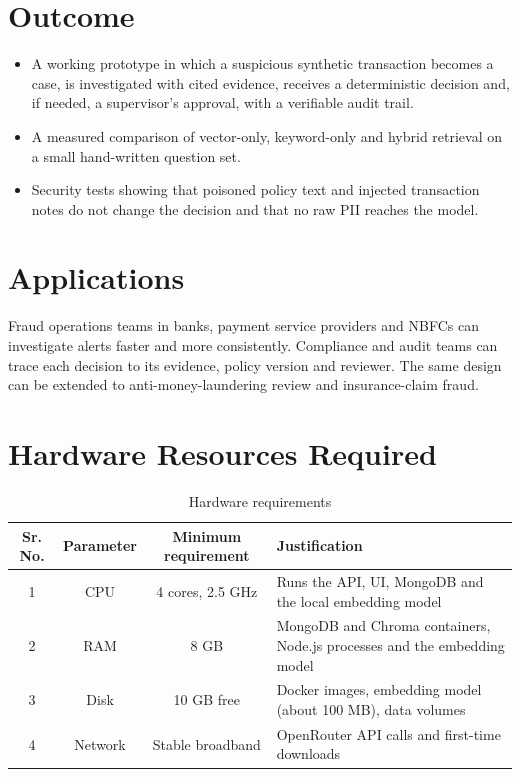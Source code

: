 \documentclass[oneside,a4paper,12pt]{report}
\begin{document}
\section{Outcome}
\begin{itemize}
  \item A working prototype in which a suspicious synthetic transaction becomes a case, is investigated with cited evidence, receives a deterministic decision and, if needed, a supervisor's approval, with a verifiable audit trail.
  \item A measured comparison of vector-only, keyword-only and hybrid retrieval on a small hand-written question set.
  \item Security tests showing that poisoned policy text and injected transaction notes do not change the decision and that no raw PII reaches the model.
\end{itemize}

\section{Applications}
Fraud operations teams in banks, payment service providers and NBFCs can investigate alerts faster and more consistently. Compliance and audit teams can trace each decision to its evidence, policy version and reviewer. The same design can be extended to anti-money-laundering review and insurance-claim fraud.

\section{Hardware Resources Required}
\begin{table}[H]
\centering
\begin{tabular}{|c|c|c|p{6cm}|}
\hline
Sr. No. & Parameter & Minimum requirement & Justification \\ \hline
1 & CPU & 4 cores, 2.5 GHz & Runs the API, UI, MongoDB and the local embedding model \\ \hline
2 & RAM & 8 GB & MongoDB and Chroma containers, Node.js processes and the embedding model \\ \hline
3 & Disk & 10 GB free & Docker images, embedding model (about 100 MB), data volumes \\ \hline
4 & Network & Stable broadband & OpenRouter API calls and first-time downloads \\ \hline
\end{tabular}
\caption{Hardware requirements}
\label{tab:hreq}
\end{table}
\end{document}
